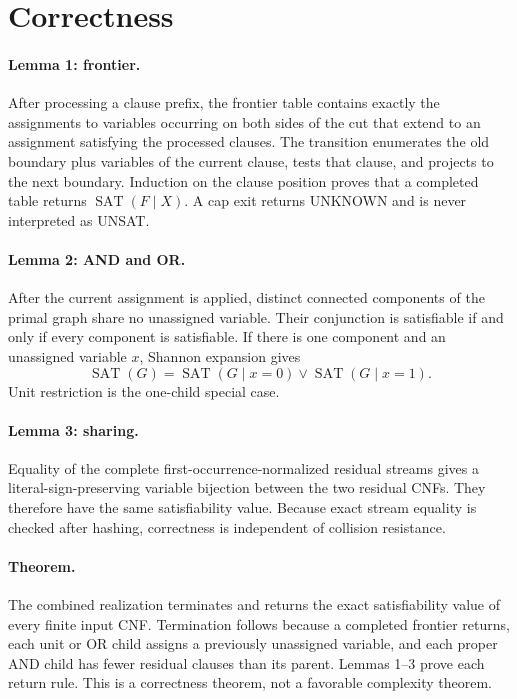 \documentclass[11pt]{article}
\begin{document}
\section{Correctness}
\paragraph{Lemma 1: frontier.}
After processing a clause prefix, the frontier table contains exactly the
assignments to variables occurring on both sides of the cut that extend to an
assignment satisfying the processed clauses.  The transition enumerates the
old boundary plus variables of the current clause, tests that clause, and
projects to the next boundary.  Induction on the clause position proves that a
completed table returns $\operatorname{SAT}(F\mathbin{|}X)$.  A cap exit returns
UNKNOWN and is never interpreted as UNSAT.

\paragraph{Lemma 2: AND and OR.}
After the current assignment is applied, distinct connected components of the
primal graph share no unassigned variable.  Their conjunction is satisfiable
if and only if every component is satisfiable.  If there is one component and
an unassigned variable $x$, Shannon expansion gives
\[
 \operatorname{SAT}(G)=
 \operatorname{SAT}(G\mathbin{|}x=0)\lor
 \operatorname{SAT}(G\mathbin{|}x=1).
\]
Unit restriction is the one-child special case.

\paragraph{Lemma 3: sharing.}
Equality of the complete first-occurrence-normalized residual streams gives a
literal-sign-preserving variable bijection between the two residual CNFs.
They therefore have the same satisfiability value.  Because exact stream
equality is checked after hashing, correctness is independent of collision
resistance.

\paragraph{Theorem.}
The combined realization terminates and returns the exact satisfiability value
of every finite input CNF.  Termination follows because a completed frontier
returns, each unit or OR child assigns a previously unassigned variable, and
each proper AND child has fewer residual clauses than its parent.  Lemmas 1--3
prove each return rule.  This is a correctness theorem, not a favorable
complexity theorem.
\end{document}
